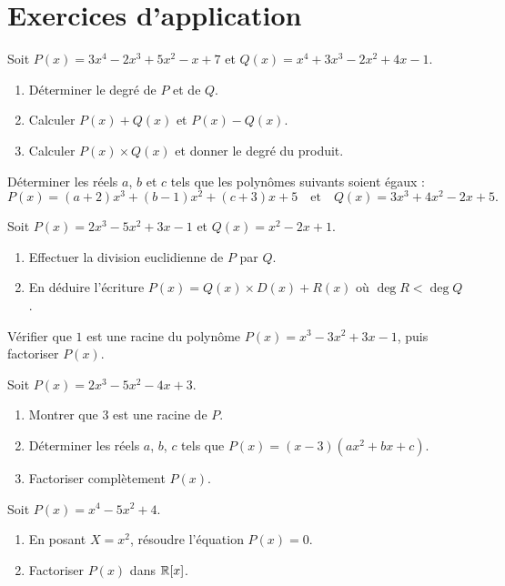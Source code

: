 \section{Exercices d'application}


\exo{}
Soit $P(x) = 3x^4 - 2x^3 + 5x^2 - x + 7$ et $Q(x) = x^4 + 3x^3 - 2x^2 + 4x - 1$.
\begin{enumerate}[label=\alph*)]
    \item Déterminer le degré de $P$ et de $Q$.
    \item Calculer $P(x) + Q(x)$ et $P(x) - Q(x)$.
    \item Calculer $P(x) \times Q(x)$ et donner le degré du produit.
\end{enumerate}

\exo{}
Déterminer les réels $a$, $b$ et $c$ tels que les polynômes suivants soient égaux :
\[
P(x) = (a+2)x^3 + (b-1)x^2 + (c+3)x + 5 \quad \text{et} \quad Q(x) = 3x^3 + 4x^2 - 2x + 5.
\]

\exo{}
Soit $P(x) = 2x^3 - 5x^2 + 3x - 1$ et $Q(x) = x^2 - 2x + 1$.
\begin{enumerate}[label=\alph*)]
    \item Effectuer la division euclidienne de $P$ par $Q$.
    \item En déduire l'écriture $P(x) = Q(x) \times D(x) + R(x)$ où $\deg R < \deg Q$.
\end{enumerate}


\exo{}
Vérifier que $1$ est une racine du polynôme $P(x) = x^3 - 3x^2 + 3x - 1$, puis factoriser $P(x)$.

\exo{}
Soit $P(x) = 2x^3 - 5x^2 - 4x + 3$.
\begin{enumerate}[label=\alph*)]
    \item Montrer que $3$ est une racine de $P$.
    \item Déterminer les réels $a$, $b$, $c$ tels que $P(x) = (x-3)(ax^2 + bx + c)$.
    \item Factoriser complètement $P(x)$.
\end{enumerate}

\exo{}
Soit $P(x) = x^4 - 5x^2 + 4$.
\begin{enumerate}[label=\alph*)]
    \item En posant $X = x^2$, résoudre l'équation $P(x) = 0$.
    \item Factoriser $P(x)$ dans $\mathbb{R}[x]$.
\end{enumerate}

